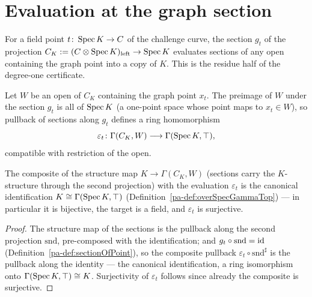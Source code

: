 \section{Evaluation at the graph section}
\label{pa-sec:graphSectionEval}

For a field point \(t \colon \operatorname{Spec} K \to C\) of the challenge curve, the section
\(g_t\) of the projection \(C_K := (C \otimes \operatorname{Spec} K)_{\mathrm{left}} \to \operatorname{Spec} K\)
evaluates sections of any open containing the graph point into a copy of \(K\). This is
the residue half of the degree-one certificate.

\begin{definition}
  \label{pa-def:graphSectionEval}
  \leanok

  Let \(W\) be an open of \(C_K\) containing the graph point \(x_t\). The preimage of
  \(W\) under the section \(g_t\) is all of \(\operatorname{Spec} K\) (a one-point space whose point maps
  to \(x_t \in W\)), so pullback of sections along \(g_t\) defines a ring homomorphism
  \[
    \varepsilon_t \colon \Gamma(C_K, W) \longrightarrow \Gamma(\operatorname{Spec} K, \top),
  \]
  compatible with restriction of the open.
\end{definition}

\begin{theorem}
  \label{pa-thm:graphSectionEval_algebraMap}
  \leanok

  The composite of the structure map \(K \to \Gamma(C_K, W)\) (sections carry the
  \(K\)-structure through the second projection) with the evaluation \(\varepsilon_t\) is
  the canonical identification \(K \cong \Gamma(\operatorname{Spec} K, \top)\)
  (Definition~\ref{pa-def:overSpecGammaTop}) — in particular it is bijective, the target is a
  field, and \(\varepsilon_t\) is surjective.
\end{theorem}
\begin{proof}
  \leanok
  The structure map of the sections is the pullback along the second projection
  \(\mathrm{snd}\), pre-composed with the identification; and
  \(g_t \circ \mathrm{snd} = \operatorname{id}\) (Definition~\ref{pa-def:sectionOfPoint}), so the composite
  pullback \(\varepsilon_t \circ \mathrm{snd}^{\sharp}\) is the pullback along the
  identity — the canonical identification, a ring isomorphism onto
  \(\Gamma(\operatorname{Spec} K, \top) \cong K\). Surjectivity of \(\varepsilon_t\) follows since
  already the composite is surjective.
\end{proof}

